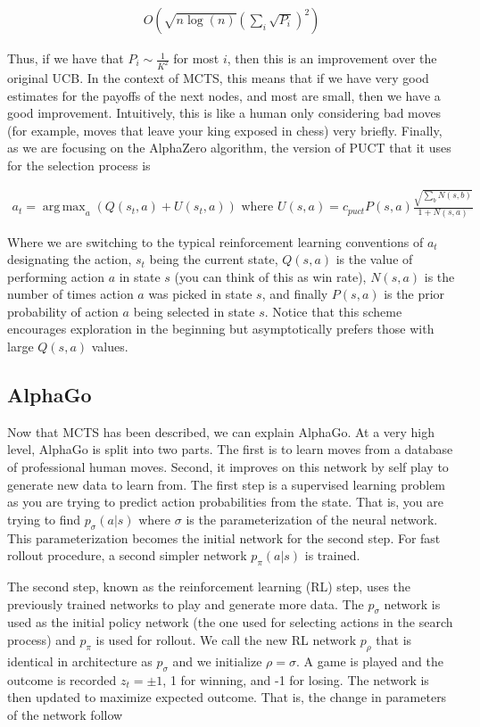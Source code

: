 \documentclass{article}
\DeclareMathOperator*{\argmax}{arg\,max}
\begin{document}
  \begin{gather*}
    O(\sqrt{n \log(n)} (\sum_i \sqrt{P_i})^2)
  \end{gather*}

  Thus, if we have that $P_i \sim \frac{1}{K^2}$ for most $i$, then this is an improvement over the original UCB. In the context of MCTS, this means that if we have very good estimates for the payoffs of the next nodes, and most are small, then we have a good improvement. Intuitively, this is like a human only considering bad moves (for example, moves that leave your king exposed in chess) very briefly. Finally, as we are focusing on the AlphaZero algorithm, the version of PUCT that it uses for the selection process is

  \begin{gather*}
    a_t = \argmax_{a} (Q(s_t,a) + U(s_t,a)) \text{ where } U(s,a) = c_{puct} P(s,a) \frac{\sqrt{\sum_b N(s,b)}}{1 + N(s,a)}
  \end{gather*}

  Where we are switching to the typical reinforcement learning conventions of $a_t$ designating the action, $s_t$ being the current state, $Q(s,a)$ is the value of performing action $a$ in state $s$ (you can think of this as win rate), $N(s,a)$ is the number of times action $a$ was picked in state $s$, and finally $P(s,a)$ is the prior probability of action $a$ being selected in state $s$. Notice that this scheme encourages exploration in the beginning but asymptotically prefers those with large $Q(s,a)$ values.

  \subsection{AlphaGo}

  Now that MCTS has been described, we can explain AlphaGo. At a very high level, AlphaGo is split into two parts. The first is to learn moves from a database of professional human moves. Second, it improves on this network by self play to generate new data to learn from. The first step is a supervised learning problem as you are trying to predict action probabilities from the state. That is, you are trying to find $p_{\sigma}(a | s)$ where $\sigma$ is the parameterization of the neural network. This parameterization becomes the initial network for the second step. For fast rollout procedure, a second simpler network $p_{\pi}(a | s)$ is trained.

  The second step, known as the reinforcement learning (RL) step, uses the previously trained networks to play and generate more data. The $p_{\sigma}$ network is used as the initial policy network (the one used for selecting actions in the search process) and $p_{\pi}$ is used for rollout. We call the new RL network $p_{\rho}$ that is identical in architecture as $p_{\sigma}$ and we initialize $\rho = \sigma$. A game is played and the outcome is recorded $z_t = \pm 1$, 1 for winning, and -1 for losing. The network is then updated to maximize expected outcome. That is, the change in parameters of the network follow
\end{document}

